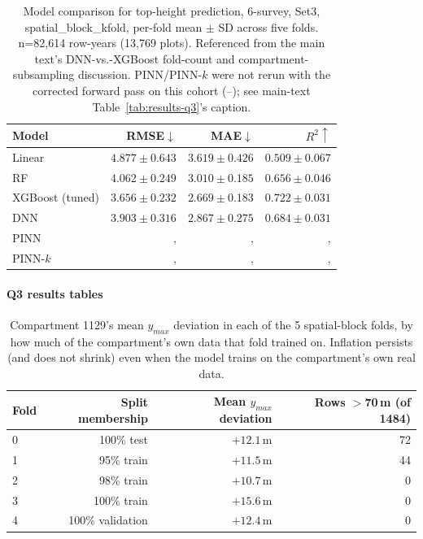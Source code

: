 \begin{table}[H]
\centering
\scriptsize
\setlength{\tabcolsep}{4pt}
\renewcommand{\arraystretch}{1.2}
\begin{tabular}{lrrr}
\toprule
Model & RMSE${\downarrow}$ & MAE${\downarrow}$ & $R^2{\uparrow}$ \\
\midrule
Linear & $4.877{\pm}0.643$ & $3.619{\pm}0.426$ & $0.509{\pm}0.067$ \\
RF & $4.062{\pm}0.249$ & $3.010{\pm}0.185$ & $0.656{\pm}0.046$ \\
XGBoost (tuned) & $\mathbf{3.656{\pm}0.232}$ & $\mathbf{2.669{\pm}0.183}$ & $\mathbf{0.722{\pm}0.031}$ \\
DNN & $3.903{\pm}0.316$ & $2.867{\pm}0.275$ & $0.684{\pm}0.031$ \\
PINN &, &, &, \\
PINN-$k$ &, &, &, \\
\bottomrule
\end{tabular}
\caption{\small{Model comparison for top-height prediction, 6-survey, Set3,
spatial\_block\_kfold, per-fold mean $\pm$ SD across five folds. n=82{,}614 row-years
(13{,}769 plots). Referenced from the main text's DNN-vs.-XGBoost fold-count and
compartment-subsampling discussion. PINN/PINN-$k$ were not rerun with the corrected
forward pass on this cohort (--); see main-text Table~\ref{tab:results-q3}'s caption.}}
\label{tab:results-q3-6survey}
\end{table}

\paragraph*{Q3 results tables}
\label{app:results-q3-tables}

\begin{table}[H]
\centering
\scriptsize
\begin{tabular}{lrrr}
\toprule
Fold & Split membership & Mean $y_{max}$ deviation & Rows $>$70\,m (of 1484) \\
\midrule
0 & 100\% test & $+12.1$\,m & 72 \\
1 & 95\% train & $+11.5$\,m & 44 \\
2 & 98\% train & $+10.7$\,m & 0 \\
3 & 100\% train & $+15.6$\,m & 0 \\
4 & 100\% validation & $+12.4$\,m & 0 \\
\bottomrule
\end{tabular}
\caption{\small{Compartment 1129's mean $y_{max}$ deviation in each of the 5 spatial-block
folds, by how much of the compartment's own data that fold trained on. Inflation persists (and
does not shrink) even when the model trains on the compartment's own real data.}}
\label{tab:compartment1129-crossfold}
\end{table}

